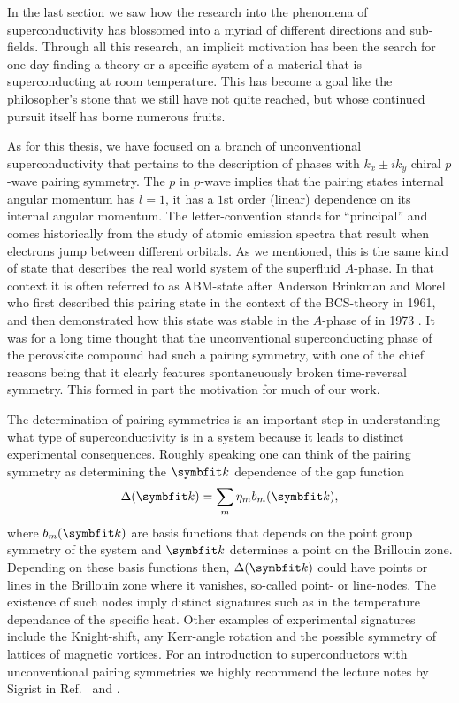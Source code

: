 In the last section we saw how the research into the phenomena of superconductivity has blossomed into a myriad of different directions and sub-fields. Through
all this research, an implicit motivation has been the search for one day finding a theory or a specific system of a material that is superconducting at
room temperature. This has become a goal like the philosopher's stone that we still have not quite reached, but whose continued pursuit itself has borne
numerous fruits. 

As for this thesis, we have focused on a branch of unconventional superconductivity that pertains to the description of phases with
$k_x\pm ik_y$ chiral $p$-wave pairing symmetry. The $p$ in $p$-wave implies that the pairing states internal angular momentum has $l=1$, \ie it has a $1$st order (linear) dependence
on its internal angular momentum. The letter-convention stands for ``principal'' and comes historically from the study of atomic emission spectra 
that result when electrons jump between different orbitals. As we mentioned, this is the same kind of state that describes the real world system of the
 superfluid $A$-phase. In that context it is often referred to as ABM-state after Anderson Brinkman and Morel who first described this pairing
state in the context of the BCS-theory \cite{Anderson61} in 1961, and then demonstrated how this state was stable in the $A$-phase
of  in 1973 \cite{Anderson73}. It was for a long time thought that the unconventional superconducting phase of the perovskite compound 
had such a pairing symmetry, with one of the chief reasons being that it clearly features spontaneuously broken time-reversal symmetry. This
formed in part the motivation for much of our work.

The determination of pairing symmetries is an important step in understanding what type of superconductivity is in a system because it leads to distinct
experimental consequences. Roughly speaking one can think of the pairing symmetry as determining the $\v{k}$ dependence of the gap function
\begin{equation}
    \label{eq:Intro:GapFunc}
    \Delta(\v{k}) = \sum_{m}\eta_mb_m(\v{k}),
\end{equation}
where $b_m(\v{k})$ are basis functions that depends on the point group symmetry of the system and $\v{k}$ determines a point on the Brillouin zone. Depending
on these basis functions then, $\Delta(\v{k})$ could have points or lines in the Brillouin zone where it vanishes, so-called point- or line-nodes. The 
existence of such nodes imply distinct signatures such as in the temperature dependance of the specific heat. Other examples of experimental signatures include
the Knight-shift, any Kerr-angle rotation and the possible symmetry of lattices of magnetic vortices. For an introduction to superconductors with
unconventional pairing symmetries we highly recommend the lecture notes by Sigrist in Ref.~\cite{Sigrist05} and \cite{Sigrist09}.

